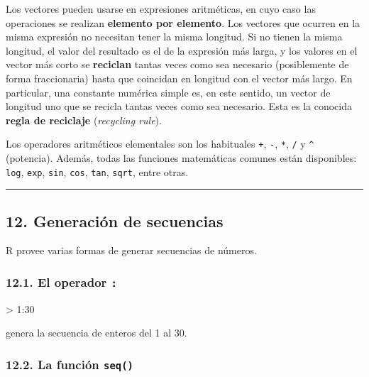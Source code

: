 \documentclass[
  jou,
  floatsintext,
  longtable,
  a4paper,
  nolmodern,
  notxfonts,
  notimes,
  12pt,
  colorlinks=true,linkcolor=blue,citecolor=blue,urlcolor=blue]{apa7}
\newenvironment{Shaded}{\begin{snugshade}}{\end{snugshade}}
\newcommand{\DecValTok}[1]{\textcolor[rgb]{0.68,0.00,0.00}{#1}}
\newcommand{\SpecialCharTok}[1]{\textcolor[rgb]{0.37,0.37,0.37}{#1}}
\begin{document}
Los vectores pueden usarse en expresiones aritméticas, en cuyo caso las
operaciones se realizan \textbf{elemento por elemento}. Los vectores que
ocurren en la misma expresión no necesitan tener la misma longitud. Si
no tienen la misma longitud, el valor del resultado es el de la
expresión más larga, y los valores en el vector más corto se
\textbf{reciclan} tantas veces como sea necesario (posiblemente de forma
fraccionaria) hasta que coincidan en longitud con el vector más largo.
En particular, una constante numérica simple es, en este sentido, un
vector de longitud uno que se recicla tantas veces como sea necesario.
Esta es la conocida \textbf{regla de reciclaje} (\emph{recycling rule}).

Los operadores aritméticos elementales son los habituales \texttt{+},
\texttt{-}, \texttt{*}, \texttt{/} y \texttt{\^{}} (potencia). Además,
todas las funciones matemáticas comunes están disponibles: \texttt{log},
\texttt{exp}, \texttt{sin}, \texttt{cos}, \texttt{tan}, \texttt{sqrt},
entre otras.

\begin{center}\rule{0.5\linewidth}{0.5pt}\end{center}

\subsection{12. Generación de
secuencias}\label{generaciuxf3n-de-secuencias}

R provee varias formas de generar secuencias de números.

\subsubsection{\texorpdfstring{12.1. El operador
\texttt{:}}{12.1. El operador :}}\label{el-operador}

\begin{Shaded}
\begin{Highlighting}[]
\SpecialCharTok{\textgreater{}} \DecValTok{1}\SpecialCharTok{:}\DecValTok{30}
\end{Highlighting}
\end{Shaded}

genera la secuencia de enteros del 1 al 30.

\subsubsection{\texorpdfstring{12.2. La función
\texttt{seq()}}{12.2. La función seq()}}\label{la-funciuxf3n-seq}
\end{document}

